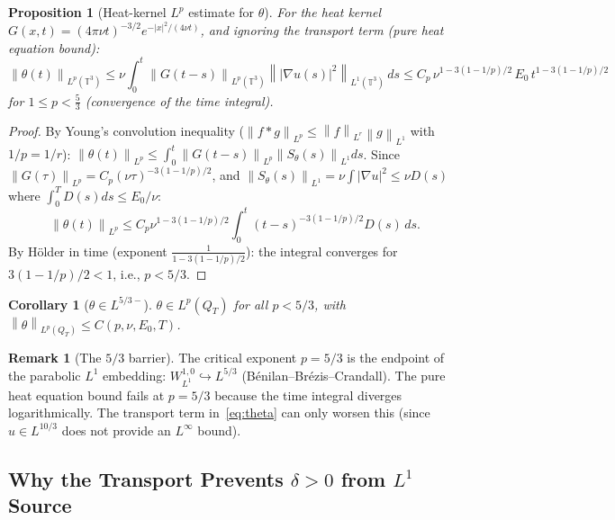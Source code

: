 \documentclass[11pt]{article}
\newtheorem{proposition}[theorem]{Proposition}
\newtheorem{corollary}[theorem]{Corollary}
\theoremstyle{definition}
\newtheorem{remark}[theorem]{Remark}
\theoremstyle{remark}
\newcommand{\T}{\mathbb{T}}
\newcommand{\norm}[1]{\left\|#1\right\|}
\newcommand{\grad}{\nabla}
\begin{document}
\begin{proposition}[Heat-kernel $L^p$ estimate for $\theta$]\label{prop:theta-Lp}
  For the heat kernel $G(x,t) = (4\pi\nu t)^{-3/2}e^{-|x|^2/(4\nu t)}$,
  and ignoring the transport term (pure heat equation bound):
  \begin{equation}\label{eq:theta-pure-heat}
    \norm{\theta(t)}_{L^p(\T^3)}
    \leq \nu\int_0^t \norm{G(t-s)}_{L^{p}(\T^3)}
      \norm{|\grad u(s)|^2}_{L^1(\T^3)}\,ds
    \leq C_p\,\nu^{1-3(1-1/p)/2}\,E_0\,t^{1-3(1-1/p)/2}
  \end{equation}
  for $1\leq p < \frac{5}{3}$ (convergence of the time integral).
\end{proposition}

\begin{proof}
  By Young's convolution inequality ($\norm{f*g}_{L^p}\leq\norm{f}_{L^r}\norm{g}_{L^1}$
  with $1/p=1/r$):
  $\norm{\theta(t)}_{L^p}\leq\int_0^t\norm{G(t-s)}_{L^p}\norm{S_\theta(s)}_{L^1}ds$.
  Since $\norm{G(\tau)}_{L^p}=C_p(\nu\tau)^{-3(1-1/p)/2}$, and
  $\norm{S_\theta(s)}_{L^1}=\nu\int|\grad u|^2\leq\nu D(s)$ where
  $\int_0^T D(s)ds\leq E_0/\nu$:
  \[
    \norm{\theta(t)}_{L^p}\leq C_p\nu^{1-3(1-1/p)/2}
    \int_0^t (t-s)^{-3(1-1/p)/2}D(s)\,ds.
  \]
  By H\"older in time (exponent $\frac{1}{1-3(1-1/p)/2}$):
  the integral converges for $3(1-1/p)/2 < 1$, i.e., $p < 5/3$.
\end{proof}

\begin{corollary}[$\theta\in L^{5/3-}$]\label{cor:theta-L53}
  $\theta\in L^p(Q_T)$ for all $p<5/3$, with
  $\norm{\theta}_{L^p(Q_T)}\leq C(p,\nu,E_0,T)$.
\end{corollary}

\begin{remark}[The $5/3$ barrier]
  The critical exponent $p=5/3$ is the endpoint of the parabolic $L^1$
  embedding: $W^{1,0}_{L^1}\hookrightarrow L^{5/3}$ (B\'enilan--Br\'ezis--Crandall).
  The pure heat equation bound fails at $p=5/3$ because the time integral
  diverges logarithmically.  The transport term in~\eqref{eq:theta} can
  only worsen this (since $u\in L^{10/3}$ does not provide an $L^\infty$
  bound).
\end{remark}

\subsection{Why the Transport Prevents $\delta>0$ from $L^1$ Source}
\end{document}
